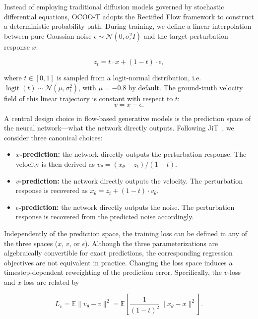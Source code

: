 \documentclass[11pt]{article}
\begin{document}
Instead of employing traditional diffusion models governed by stochastic differential equations, OCOO-T adopts the Rectified Flow framework to construct a deterministic probability path. During training, we define a linear interpolation between pure Gaussian noise $\epsilon \sim \mathcal{N}(0, \sigma_{\epsilon}^2 I)$ and the target perturbation response $x$:

\begin{equation}
  z_t = t\cdot x + (1-t)\cdot \epsilon,
\end{equation}

where $t \in [0,1]$ is sampled from a logit-normal distribution, i.e.\ $\operatorname{logit}(t) \sim \mathcal{N}(\mu, \sigma_{t}^2)$, with $\mu = -0.8$ by default. The ground-truth velocity field of this linear trajectory is constant with respect to $t$:
\begin{equation}
  v = x - \epsilon.
\end{equation}

A central design choice in flow-based generative models is the prediction space of the neural network---what the network directly outputs. Following JiT~\cite{li2025back}, we consider three canonical choices:

\begin{itemize}
  \item \textbf{$x$-prediction:} the network directly outputs the perturbation response. The velocity is then derived as $v_{\theta} = (x_{\theta} - z_t)/(1-t)$.
  \item \textbf{$v$-prediction:} the network directly outputs the velocity. The perturbation response is recovered as $x_{\theta} = z_t + (1-t)\cdot v_{\theta}$.
  \item \textbf{$\epsilon$-prediction:} the network directly outputs the noise. The perturbation response is recovered from the predicted noise accordingly.
\end{itemize}

Independently of the prediction space, the training loss can be defined in any of the three spaces ($x$, $v$, or $\epsilon$). Although the three parameterizations are algebraically convertible for exact predictions, the corresponding regression objectives are not equivalent in practice. Changing the loss space induces a timestep-dependent reweighting of the prediction error. Specifically, the $v$-loss and $x$-loss are related by

\begin{equation}
  L_v = \mathbb{E}\lVert v_{\theta} - v \rVert^2 = \mathbb{E}\left[\frac{1}{(1-t)^2}\lVert x_{\theta} - x \rVert^2\right].
\end{equation}
\end{document}
